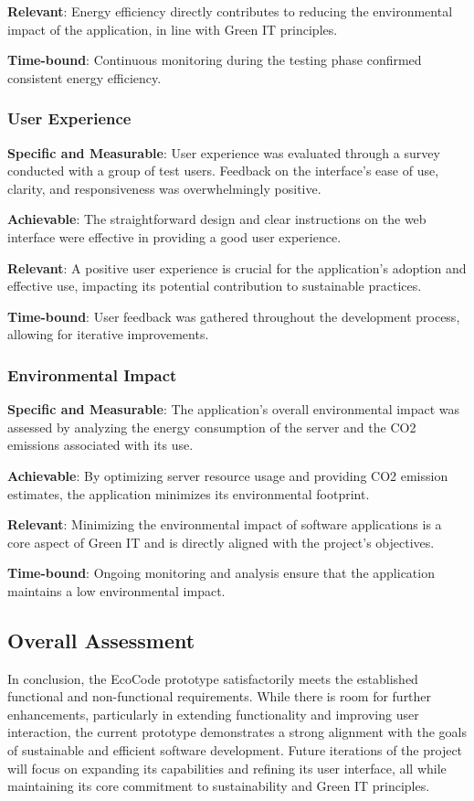 \documentclass[conference,compsoc]{IEEEtran}
\begin{document}
\textbf{Relevant}: Energy efficiency directly contributes to reducing the environmental impact of the application, in line with Green IT principles.

\textbf{Time-bound}: Continuous monitoring during the testing phase confirmed consistent energy efficiency.

\subsubsection{User Experience}
\textbf{Specific and Measurable}: User experience was evaluated through a survey conducted with a group of test users. Feedback on the interface's ease of use, clarity, and responsiveness was overwhelmingly positive.

\textbf{Achievable}: The straightforward design and clear instructions on the web interface were effective in providing a good user experience.

\textbf{Relevant}: A positive user experience is crucial for the application's adoption and effective use, impacting its potential contribution to sustainable practices.

\textbf{Time-bound}: User feedback was gathered throughout the development process, allowing for iterative improvements.

\subsubsection{Environmental Impact}
\textbf{Specific and Measurable}: The application's overall environmental impact was assessed by analyzing the energy consumption of the server and the CO2 emissions associated with its use.

\textbf{Achievable}: By optimizing server resource usage and providing CO2 emission estimates, the application minimizes its environmental footprint.

\textbf{Relevant}: Minimizing the environmental impact of software applications is a core aspect of Green IT and is directly aligned with the project's objectives.

\textbf{Time-bound}: Ongoing monitoring and analysis ensure that the application maintains a low environmental impact.

\subsection{Overall Assessment}
In conclusion, the EcoCode prototype satisfactorily meets the established functional and non-functional requirements. While there is room for further enhancements, particularly in extending functionality and improving user interaction, the current prototype demonstrates a strong alignment with the goals of sustainable and efficient software development. Future iterations of the project will focus on expanding its capabilities and refining its user interface, all while maintaining its core commitment to sustainability and Green IT principles.
\end{document}
